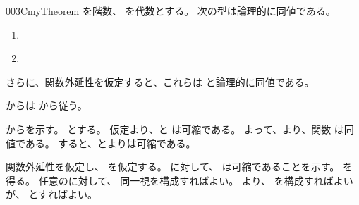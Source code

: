 \documentclass[index]{subfiles}
\begin{document}
\begin{myBlock}{003C}{myTheorem}
  を階数、
  を\myInlineMath{\myNat}代数とする。
  次の型は論理的に同値である。
  \begin{enumerate}
  \item \label{003C:0000} 
  \item \label{003C:0001} 
  \end{enumerate}
  さらに、関数外延性を仮定すると、これらは
  と論理的に同値である。
\end{myBlock}
\begin{myProof}
  からは
  から従う。

  からを示す。
  とする。
  仮定より、と
  は可縮である。
  よって、より、関数
  は同値である。
  すると、とよりは可縮である。

  関数外延性を仮定し、
  を仮定する。
  に対して、
  は可縮であることを示す。
  を得る。
  任意のに対して、
  同一視を構成すればよい。
  より、
  を構成すればよいが、
  とすればよい。
\end{myProof}
\end{document}
